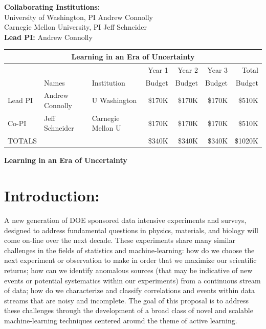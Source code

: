\documentclass[useAMS,usenatbib,tightenlines,11pt,preprint]{aastex}
\begin{document}
\newpage

{\bf Collaborating Institutions:} \\
University of Washington, PI Andrew Connolly \\
Carnegie Mellon University, PI Jeff Schneider \\

{\bf Lead PI:} Andrew Connolly \\

\noindent
\begin{tabular}{|l|l|l|r|r|r|r|}
\hline
\multicolumn{7}{|c|}{\bf Learning in an Era of Uncertainty} \\ \hline
&       &             & Year 1 & Year 2 & Year 3 & Total \\
& Names & Institution & Budget & Budget & Budget & Budget \\ \hline
Lead PI & Andrew Connolly & U Washington & \$170K & \$170K & \$170K & \$510K \\ \hline
Co-PI & Jeff Schneider & Carnegie Mellon U & \$170K & \$170K & \$170K & \$510K \\ \hline
{TOTALS} & & & \$340K & \$340K & \$340K & \$1020K \\ \hline
\end{tabular}


\newpage

\begin{center}
{\bf \Large Learning in an Era of Uncertainty}
\end{center}

\section{Introduction:}
A new generation of DOE sponsored data intensive experiments and
surveys, designed to address fundamental questions in physics, materials, and
biology will come on-line over the next decade. These experiments
share many similar challenges in the fields of statistics and
machine-learning: how do we choose the next experiment or observation
to make in order that we maximize our scientific returns; how can we
identify anomalous sources (that may be indicative of new events or
potential systematics within our experiments) from a continuous stream
of data; how do we characterize and classify correlations and events
within data streams that are noisy and incomplete. The goal of this
proposal is to address these challenges through the development of a broad
class of novel and scalable machine-learning techniques centered
around the theme of active learning.
\end{document}
